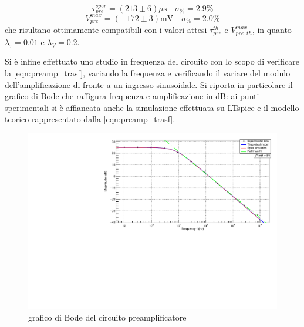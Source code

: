 \documentclass{article}
\begin{document}
\[\tau_{pre}^{sper} = (213 \pm 6)\mu \text{s} \quad \sigma_{\%} = 2.9 \%    \]
\[V_{pre}^{max} = (-172 \pm 3)\text{mV} \quad \sigma_{\%} = 2.0 \%\]
che risultano ottimamente compatibili con i valori attesi  $\tau_{pre}^{th}$ e $V_{pre,th}^{max}$, in quanto $\lambda_{\tau} = 0.01$
e $\lambda_{V}=0.2$.
 
\medskip

Si è infine effettuato uno studio in frequenza del circuito con lo scopo di verificare la \ref{eqn:preamp_trasf}, variando la frequenza
e verificando il variare del modulo dell'amplificazione di fronte a un ingresso sinusoidale.
Si riporta in particolare il grafico di Bode che raffigura frequenza e amplificazione in dB: ai punti sperimentali si è affiancata
anche la simulazione effettuata su LTspice e il modello teorico rappresentato dalla \ref{eqn:preamp_trasf}.

\begin{center}
\begin{figure}[H]
\centering
\includegraphics[scale=0.4, angle=0]{bodepreamp.pdf}
\caption{grafico di Bode del circuito preamplificatore}
\label{fig:bodepreamp}
\end{figure}
\end{center}



\end{document}
